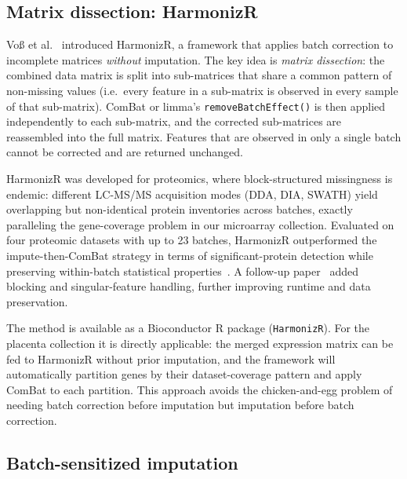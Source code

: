 \documentclass[11pt,a4paper]{article}
\begin{document}
\subsection{Matrix dissection: HarmonizR}

Vo{\ss} et al.~\cite{voss2022} introduced HarmonizR, a framework
that applies batch correction to incomplete matrices \emph{without}
imputation. The key idea is \emph{matrix dissection}: the combined
data matrix is split into sub-matrices that share a common pattern
of non-missing values (i.e.\ every feature in a sub-matrix is
observed in every sample of that sub-matrix). ComBat or limma's
\texttt{removeBatchEffect()} is then applied independently to each
sub-matrix, and the corrected sub-matrices are reassembled into the
full matrix. Features that are observed in only a single batch
cannot be corrected and are returned unchanged.

HarmonizR was developed for proteomics, where block-structured
missingness is endemic: different LC-MS/MS acquisition modes (DDA,
DIA, SWATH) yield overlapping but non-identical protein inventories
across batches, exactly paralleling the gene-coverage problem in
our microarray collection. Evaluated on four proteomic datasets
with up to 23 batches, HarmonizR outperformed the impute-then-ComBat
strategy in terms of significant-protein detection while
preserving within-batch statistical properties~\cite{voss2022}.
A follow-up paper~\cite{voss2025} added blocking and singular-feature
handling, further improving runtime and data preservation.

The method is available as a Bioconductor R package
(\texttt{HarmonizR}). For the placenta collection it is directly
applicable: the merged expression matrix can be fed to HarmonizR
without prior imputation, and the framework will automatically
partition genes by their dataset-coverage pattern and apply ComBat
to each partition. This approach avoids the chicken-and-egg problem
of needing batch correction before imputation but imputation before
batch correction.

\subsection{Batch-sensitized imputation}
\end{document}
